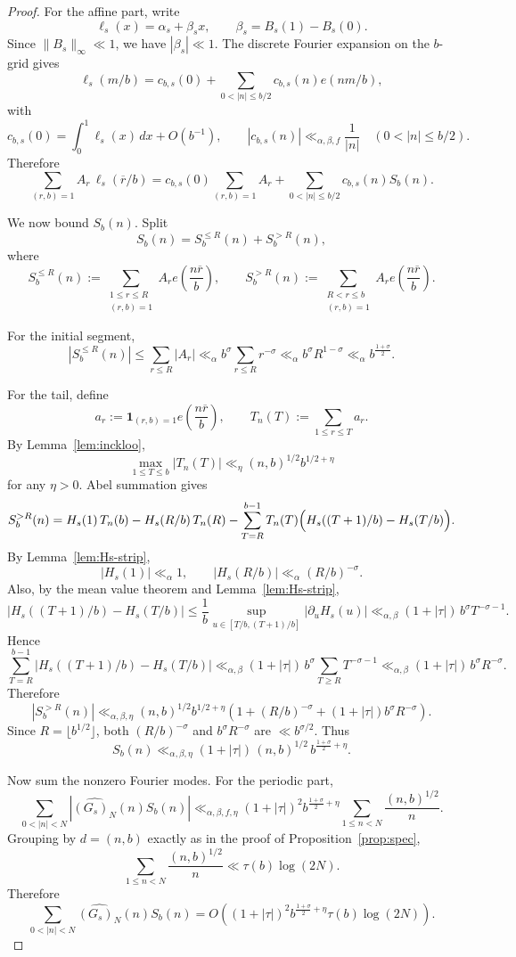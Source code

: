 \documentclass[10pt,a4paper]{amsart}
\newcommand{\ind}{\mathbf 1}
\begin{document}
\begin{proof}
For the affine part, write
\[
\ell_s(x)=\alpha_s+\beta_s x,
\qquad \beta_s=B_s(1)-B_s(0).
\]
Since \(\|B_s\|_\infty\ll1\), we have \(|\beta_s|\ll1\). The discrete Fourier expansion on the \(b\)-grid gives
\[
\ell_s(m/b)=c_{b,s}(0)+\sum_{0<|n|\le b/2}c_{b,s}(n)e(nm/b),
\]
with
\[
c_{b,s}(0)=\int_0^1 \ell_s(x)\,dx+O(b^{-1}),
\qquad
|c_{b,s}(n)|\ll_{\alpha,\beta,f}\frac{1}{|n|}
\quad (0<|n|\le b/2).
\]
Therefore
\[
\sum_{(r,b)=1}A_r\,\ell_s(\overline r/b)
=
c_{b,s}(0)\sum_{(r,b)=1}A_r
+
\sum_{0<|n|\le b/2}c_{b,s}(n)S_b(n).
\]

We now bound \(S_b(n)\). Split
\[
S_b(n)=S_b^{\le R}(n)+S_b^{>R}(n),
\]
where
\[
S_b^{\le R}(n):=\sum_{\substack{1\le r\le R\\(r,b)=1}}A_r e\!\left(\frac{n\overline r}{b}\right),
\qquad
S_b^{>R}(n):=\sum_{\substack{R<r\le b\\(r,b)=1}}A_r e\!\left(\frac{n\overline r}{b}\right).
\]

For the initial segment,
\[
|S_b^{\le R}(n)|
\le
\sum_{r\le R}|A_r|
\ll_\alpha
b^\sigma\sum_{r\le R}r^{-\sigma}
\ll_\alpha
b^\sigma R^{1-\sigma}
\ll_\alpha
b^{\frac{1+\sigma}{2}}.
\]

For the tail, define
\[
a_r:=\ind_{(r,b)=1}e\!\left(\frac{n\overline r}{b}\right),
\qquad
T_n(T):=\sum_{1\le r\le T}a_r.
\]
By Lemma~\ref{lem:inckloo},
\[
\max_{1\le T\le b}|T_n(T)|
\ll_\eta
(n,b)^{1/2}b^{1/2+\eta}
\]
for any \(\eta>0\). Abel summation gives
\[
S_b^{>R}(n)
=
H_s(1)\,T_n(b)-H_s(R/b)\,T_n(R)
-\sum_{T=R}^{b-1}T_n(T)\Bigl(H_s((T+1)/b)-H_s(T/b)\Bigr).
\]
By Lemma~\ref{lem:Hs-strip},
\[
|H_s(1)|\ll_\alpha 1,
\qquad
|H_s(R/b)|\ll_\alpha (R/b)^{-\sigma}.
\]
Also, by the mean value theorem and Lemma~\ref{lem:Hs-strip},
\[
|H_s((T+1)/b)-H_s(T/b)|
\le
\frac1b\sup_{u\in[T/b,(T+1)/b]}|\partial_u H_s(u)|
\ll_{\alpha,\beta}
(1+|\tau|)\,b^\sigma T^{-\sigma-1}.
\]
Hence
\[
\sum_{T=R}^{b-1}|H_s((T+1)/b)-H_s(T/b)|
\ll_{\alpha,\beta}
(1+|\tau|)\,b^\sigma\sum_{T\ge R}T^{-\sigma-1}
\ll_{\alpha,\beta}
(1+|\tau|)\,b^\sigma R^{-\sigma}.
\]
Therefore
\[
|S_b^{>R}(n)|
\ll_{\alpha,\beta,\eta}
(n,b)^{1/2}b^{1/2+\eta}
\left(
1+(R/b)^{-\sigma}+(1+|\tau|)b^\sigma R^{-\sigma}
\right).
\]
Since \(R=\lfloor b^{1/2}\rfloor\), both \((R/b)^{-\sigma}\) and \(b^\sigma R^{-\sigma}\) are
\(\ll b^{\sigma/2}\). Thus
\[
S_b(n)\ll_{\alpha,\beta,\eta}
(1+|\tau|)\,(n,b)^{1/2}\,b^{\frac{1+\sigma}{2}+\eta}.
\]

Now sum the nonzero Fourier modes. For the periodic part,
\[
\sum_{0<|n|<N}|\widehat{(G_s)_N}(n)S_b(n)|
\ll_{\alpha,\beta,f,\eta}
(1+|\tau|)^2 b^{\frac{1+\sigma}{2}+\eta}
\sum_{1\le n<N}\frac{(n,b)^{1/2}}{n}.
\]
Grouping by \(d=(n,b)\) exactly as in the proof of Proposition~\ref{prop:spec},
\[
\sum_{1\le n<N}\frac{(n,b)^{1/2}}{n}
\ll \tau(b)\log(2N).
\]
Therefore
\[
\sum_{0<|n|<N}\widehat{(G_s)_N}(n)S_b(n)
=
O\!\left((1+|\tau|)^2 b^{\frac{1+\sigma}{2}+\eta}\tau(b)\log(2N)\right).
\]


\end{proof}
\end{document}
